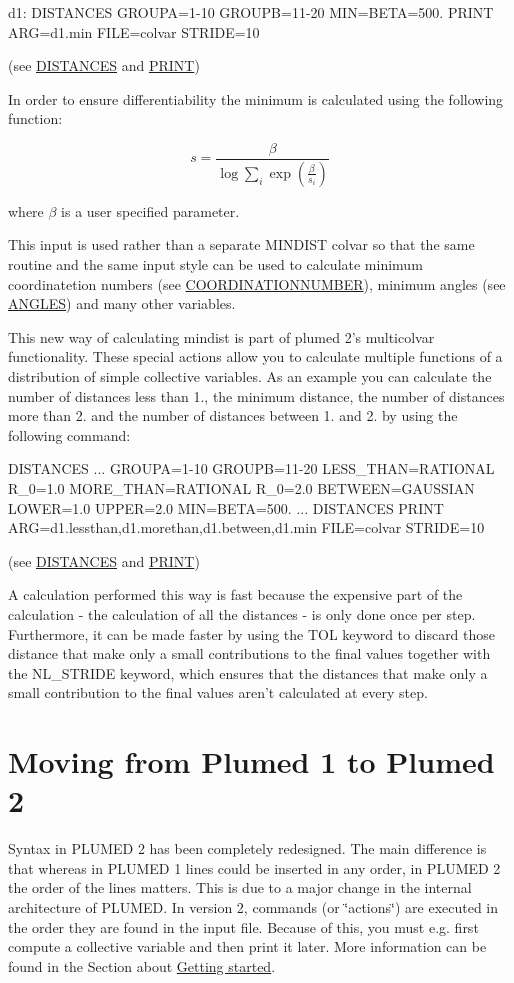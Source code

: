 \begin{DoxyVerb}d1: DISTANCES GROUPA=1-10 GROUPB=11-20 MIN={BETA=500.} 
PRINT ARG=d1.min FILE=colvar STRIDE=10
\end{DoxyVerb}
 (see \hyperlink{DISTANCES}{D\+I\+S\+T\+A\+N\+C\+E\+S} and \hyperlink{PRINT}{P\+R\+I\+N\+T})

In order to ensure differentiability the minimum is calculated using the following function\+:

\[ s = \frac{\beta}{ \log \sum_i \exp\left( \frac{\beta}{s_i} \right) } \]

where $\beta$ is a user specified parameter.

This input is used rather than a separate M\+I\+N\+D\+I\+S\+T colvar so that the same routine and the same input style can be used to calculate minimum coordinatetion numbers (see \hyperlink{COORDINATIONNUMBER}{C\+O\+O\+R\+D\+I\+N\+A\+T\+I\+O\+N\+N\+U\+M\+B\+E\+R}), minimum angles (see \hyperlink{ANGLES}{A\+N\+G\+L\+E\+S}) and many other variables.

This new way of calculating mindist is part of plumed 2's multicolvar functionality. These special actions allow you to calculate multiple functions of a distribution of simple collective variables. As an example you can calculate the number of distances less than 1., the minimum distance, the number of distances more than 2. and the number of distances between 1. and 2. by using the following command\+:

\begin{DoxyVerb}DISTANCES ...
 GROUPA=1-10 GROUPB=11-20 
 LESS_THAN={RATIONAL R_0=1.0} 
 MORE_THAN={RATIONAL R_0=2.0} 
 BETWEEN={GAUSSIAN LOWER=1.0 UPPER=2.0} 
 MIN={BETA=500.}
... DISTANCES
PRINT ARG=d1.lessthan,d1.morethan,d1.between,d1.min FILE=colvar STRIDE=10
\end{DoxyVerb}
 (see \hyperlink{DISTANCES}{D\+I\+S\+T\+A\+N\+C\+E\+S} and \hyperlink{PRINT}{P\+R\+I\+N\+T})

A calculation performed this way is fast because the expensive part of the calculation -\/ the calculation of all the distances -\/ is only done once per step. Furthermore, it can be made faster by using the T\+O\+L keyword to discard those distance that make only a small contributions to the final values together with the N\+L\+\_\+\+S\+T\+R\+I\+D\+E keyword, which ensures that the distances that make only a small contribution to the final values aren't calculated at every step. \hypertarget{moving}{}\section{Moving from Plumed 1 to Plumed 2}\label{moving}
Syntax in P\+L\+U\+M\+E\+D 2 has been completely redesigned. The main difference is that whereas in P\+L\+U\+M\+E\+D 1 lines could be inserted in any order, in P\+L\+U\+M\+E\+D 2 the order of the lines matters. This is due to a major change in the internal architecture of P\+L\+U\+M\+E\+D. In version 2, commands (or \char`\"{}actions\char`\"{}) are executed in the order they are found in the input file. Because of this, you must e.\+g. first compute a collective variable and then print it later. More information can be found in the Section about \hyperlink{_syntax}{Getting started}.

